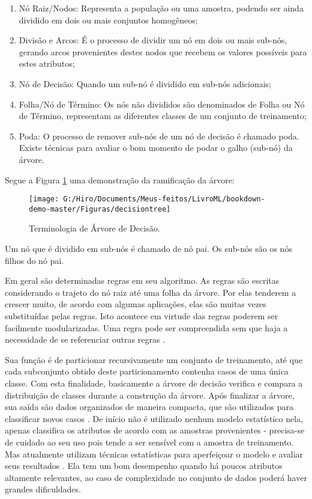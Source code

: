 \documentclass[
  openany]{book}
\begin{document}
\begin{enumerate}
\def\labelenumi{\arabic{enumi}.}
\item
  Nó Raiz/Nodos: Representa a população ou uma amostra, podendo ser ainda dividido em dois ou mais conjuntos homogêneos;
\item
  Divisão e Arcos: É o processo de dividir um nó em dois ou mais sub-nós, gerando arcos provenientes destes nodos que recebem os valores possíveis para estes atributos;
\item
  Nó de Decisão: Quando um sub-nó é dividido em sub-nós adicionais;
\item
  Folha/Nó de Término: Os nós não divididos são denominados de Folha ou Nó de Término, representam as diferentes classes de um conjunto de treinamento;
\item
  Poda: O processo de remover sub-nós de um nó de decisão é chamado poda. Existe técnicas para avaliar o bom momento de podar o galho (sub-nó) da árvore.
\end{enumerate}

Segue a Figura \ref{fig:decisiontree} uma demonstração da ramificação da árvore:

\begin{figure}

{\centering \texttt{[image: G:/Hiro/Documents/Meus-feitos/LivroML/bookdown-demo-master/Figuras/decisiontree]} 

}

\caption{Terminologia de Árvore de Decisão.}\label{fig:decisiontree}
\end{figure}



Um nó que é dividido em sub-nós é chamado de nó pai. Os sub-nós são os nós filhos do nó pai.

Em geral são determinadas regras em seu algoritmo. As regras são escritas considerando o trajeto do nó raiz até uma folha da árvore. Por elas tenderem a crescer muito, de acordo com algumas aplicações, elas são muitas vezes substituídas pelas regras. Isto acontece em virtude das regras poderem ser facilmente modularizadas. Uma regra pode ser compreendida sem que haja a necessidade de se referenciar outras regras \citep{ingargiola1996building}.

Sua função é de particionar recursivamente um conjunto de treinamento, até que cada subconjunto obtido deste particionamento contenha casos de uma única classe. Com esta finalidade, basicamente a árvore de decisão verifica e compara a distribuição de classes durante a construção da árvore. Após finalizar a árvore, sua saída são dados organizados de maneira compacta, que são utilizados para classificar novos casos \citep{holsheimer1994data}. De início não é utilizado nenhum modelo estatístico nela, apenas classifica os atributos de acordo com as amostras provenientes - precisa-se de cuidado ao seu uso pois tende a ser sensível com a amostra de treinamento. Mas atualmente utilizam técnicas estatísticas para aperfeiçoar o modelo e avaliar seus resultados \citep{shiba2005classificaccao}. Ela tem um bom desempenho quando há poucos atributos altamente relevantes, ao caso de complexidade no conjunto de dados poderá haver grandes dificuldades.
\end{document}
